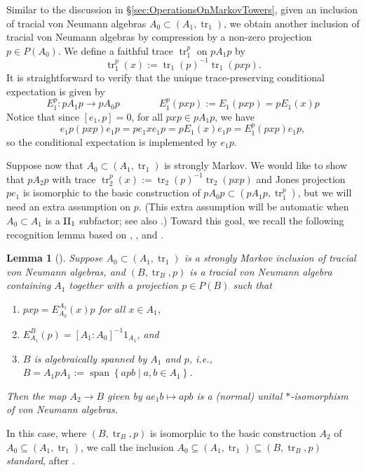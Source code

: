 \documentclass[11pt]{article}
\theoremstyle{plain}
\newtheorem{lem}[thm]{Lemma}
\theoremstyle{definition}
\DeclareMathOperator{\spann}{span}
\DeclareMathOperator{\tr}{tr}
\newcommand{\set}[2]{\left\{#1 \middle| #2\right\}}
\begin{document}
Similar to the discussion in \S\ref{sec:OperationsOnMarkovTowers}, 
given an inclusion of tracial von Neumann algebras $A_0\subset (A_1, \tr_1)$, we obtain another inclusion of tracial von Neumann algebras by compression by a non-zero projection $p\in P(A_0)$.
We define a faithful trace $\tr_1^p$ on $pA_1 p$ by
\begin{equation}
\label{eq:CompressedTrace1}
\tr^p_1(x) := \tr_1(p)^{-1}\tr_1(pxp).
\end{equation}
It is straightforward to verify that the unique trace-preserving conditional expectation is given by 
\begin{equation}
\label{eq:CompressedConditionalExpectation1}
E^p_1 : pA_1p \to pA_{0}p
\qquad
\qquad
E^p_1(pxp) := E_1(pxp) = pE_1(x)p
\end{equation}
Notice that since $[e_1,p] = 0$, for all $pxp \in pA_1 p$, we have
\begin{equation}
\label{eq:CompressionImplementsConditionalExpectation1}
e_1p (pxp) e_1p = p e_1xe_1p = pE_1(x)e_1p = E_1^p(pxp)e_1p,
\end{equation}
so the conditional expectation is implemented by $e_1p$.

Suppose now that $A_0 \subset (A_1, \tr_1)$ is strongly Markov.
We would like to show that $pA_2p$ with trace $\tr^p_2(x):=\tr_2(p)^{-1}\tr_2(pxp)$ and Jones projection $pe_1$
is isomorphic to the basic construction of $pA_0p \subset (pA_1p, \tr_1^p)$, but we will need an extra assumption on $p$.
(This extra assumption will be automatic when $A_0 \subset A_1$ is a ${\rm II}_1$ subfactor; see also \cite[Lem.~2.4]{MR1262294}.)
Toward this goal, we recall the following recognition lemma based on \cite[Prop.~1.2]{MR965748}, \cite[Lem.~5.8]{MR1073519}, and \cite[Lem.~5.3.1]{MR1473221}.

\begin{lem}[{\cite[Lem.~2.15]{MR2812459}}]
\label{lem:BasicConstructionRecognition}
Suppose $A_0 \subset (A_1, \tr_1)$ is a strongly Markov inclusion of tracial von Neumann algebras, and $(B, \tr_B, p)$ is a tracial von Neumann algebra containing $A_1$ together with a projection $p\in P(B)$ such that
\begin{enumerate}[label={\rm(R\arabic*)}]
\item
\label{eq:RecognitionImplement}
$pxp = E_{A_0}^{A_1}(x)p$ for all $x\in A_1$,
\item
\label{eq:RecognitionMarkov}
$E^{B}_{A_1}(p) = [A_1:A_0]^{-1} 1_{A_1}$, and
\item
\label{eq:RecognitionSpan}
$B$ is algebraically spanned by $A_1$ and $p$, i.e., $B = A_1pA_1 := \spann\set{apb}{a,b\in A_1}$.
\end{enumerate}
Then the map $A_2\to B$ given by $ae_1b \mapsto apb$ is a (normal) unital $*$-isomorphism of von Neumann algebras.
\end{lem}
In this case, where $(B,\tr_B,p)$ is isomorphic to the basic construction $A_2$ of $A_0\subseteq (A_1,\tr_1)$, we call the inclusion $A_0\subseteq (A_1,\tr_1)\subseteq (B,\tr_B,p)$ \textit{standard}, after \cite{MR2812459}. 
\end{document}
